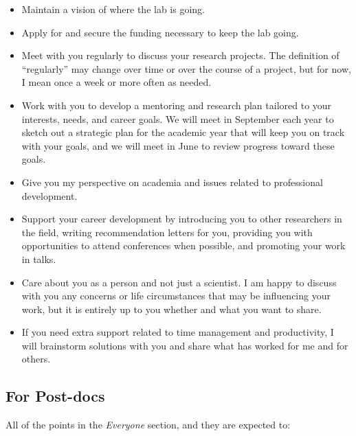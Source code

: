 \documentclass[
]{book}
\providecommand{\tightlist}{%
  \setlength{\itemsep}{0pt}\setlength{\parskip}{0pt}}
\begin{document}
\begin{itemize}
\tightlist
\item
  Maintain a vision of where the lab is going.
\item
  Apply for and secure the funding necessary to keep the lab going.
\item
  Meet with you regularly to discuss your research projects. The definition of ``regularly'' may change over time or over the course of a project, but for now, I mean once a week or more often as needed.
\item
  Work with you to develop a mentoring and research plan tailored to your interests, needs, and career goals. We will meet in September each year to sketch out a strategic plan for the academic year that will keep you on track with your goals, and we will meet in June to review progress toward these goals.
\item
  Give you my perspective on academia and issues related to professional development.
\item
  Support your career development by introducing you to other researchers in the field, writing recommendation letters for you, providing you with opportunities to attend conferences when possible, and promoting your work in talks.
\item
  Care about you as a person and not just a scientist. I am happy to discuss with you any concerns or life circumstances that may be influencing your work, but it is entirely up to you whether and what you want to share.
\item
  If you need extra support related to time management and productivity, I will brainstorm solutions with you and share what has worked for me and for others.
\end{itemize}

\hypertarget{for-post-docs}{%
\subsection{For Post-docs}\label{for-post-docs}}

All of the points in the \emph{Everyone} section, and they are expected to:
\end{document}

